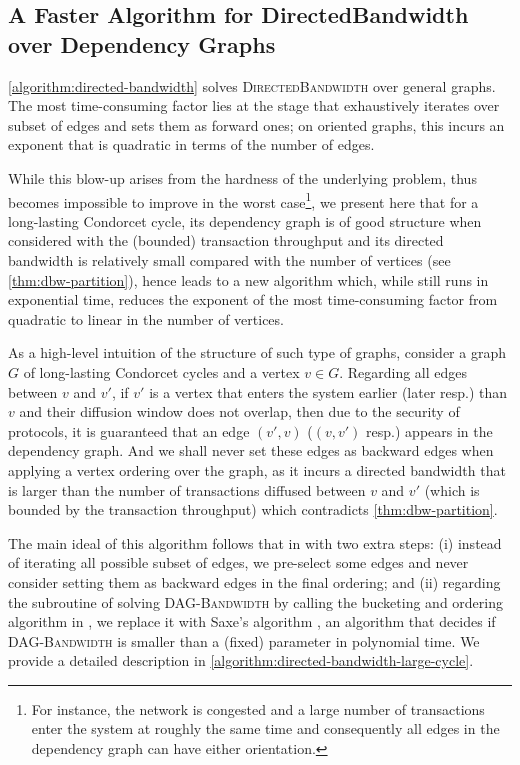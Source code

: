 \subsection{A Faster Algorithm for DirectedBandwidth over Dependency Graphs}
\label{subsec:exact-algorithm-over-dependency-graphs}

\cref{algorithm:directed-bandwidth} solves \textsc{DirectedBandwidth} over
general graphs.
%
The most time-consuming factor lies at the stage that exhaustively iterates over
subset of edges and sets them as forward ones;
%
on oriented graphs, this incurs an exponent that is quadratic in terms of the
number of edges.

While this blow-up arises from the hardness of the underlying problem, thus becomes impossible to improve in the worst case\footnote{For instance, the network is congested and a large number of transactions enter the system at roughly the same time and consequently all edges in  the dependency graph can  have either orientation.}, we present here that for a long-lasting Condorcet cycle, its dependency graph is of good structure when considered with the (bounded) transaction throughput and its directed bandwidth is relatively small compared with the number of vertices (see \cref{thm:dbw-partition}), hence leads to a new algorithm which, while still runs in exponential time, reduces the exponent of the most time-consuming factor from quadratic to linear in the number of vertices.

As a high-level intuition of the structure of such type of graphs, consider a graph $G$ of long-lasting Condorcet cycles and a vertex $v \in G$.
%
Regarding all edges between $v$ and $v'$, if $v'$ is a vertex that enters the system earlier (later resp.) than $v$ and their diffusion window does not overlap, then due to the security of \Taxis protocols, it is guaranteed that an edge $(v' ,v)$ ($(v, v')$ resp.) appears in the dependency graph.
%
And we shall never set these edges as backward edges when applying a vertex ordering over the graph, as it incurs a directed bandwidth that is larger than the number of transactions diffused between $v$ and $v'$ (which is bounded by the transaction throughput) which contradicts \cref{thm:dbw-partition}.

The main ideal of this algorithm follows that in \cite{FSTTCS:JKLSS19} with two extra steps:
%
(i) instead of iterating all possible subset of edges, we pre-select some edges and never consider setting them as backward edges in
the final ordering;
%
and (ii) regarding the subroutine of solving \textsc{DAG-Bandwidth} by calling the bucketing and ordering algorithm in \cite{CygPil08,FSTTCS:JKLSS19}, we replace it with Saxe's algorithm \cite{SIAMMAX:Saxe80}, an algorithm that decides if \textsc{DAG-Bandwidth} is smaller than a (fixed) parameter in polynomial time.
%
We provide a detailed description in \cref{algorithm:directed-bandwidth-large-cycle}.

